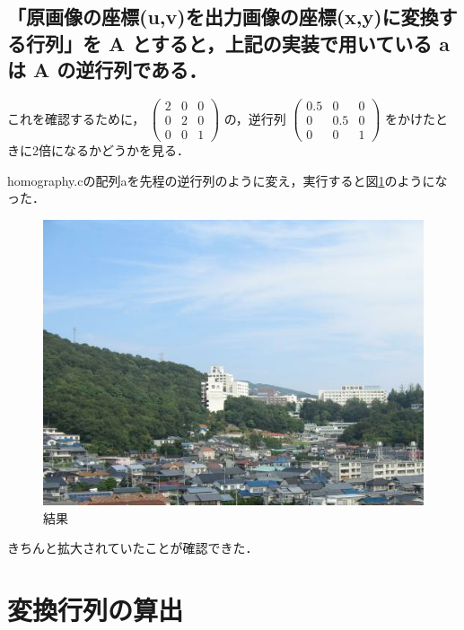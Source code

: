\documentclass[11pt]{jarticle}
\begin{document}
\subsection{「原画像の座標(u,v)を出力画像の座標(x,y)に変換する行列」を A とすると，上記の実装で用いている a は A の逆行列である．}
これを確認するために，
    $ \left(
        \begin{array}{rrr}
        2 & 0 & 0 \\
        0 & 2 & 0 \\
        0 & 0 & 1
        \end{array}
    \right) $
の，逆行列
$ \left(
    \begin{array}{rrr}
    0.5 & 0 & 0 \\
    0 & 0.5 & 0 \\
    0 & 0 & 1
    \end{array}
\right) $
をかけたときに2倍になるかどうかを見る．

homography.cの配列aを先程の逆行列のように変え，実行すると図\ref{2-8.jpg}のようになった．
\begin{figure}[h]
    \centering
    \includegraphics[scale=.2]{2-8.jpg}
    \caption{結果}
    \label{2-8.jpg}
\end{figure}

きちんと拡大されていたことが確認できた．

\section{変換行列の算出}
\end{document}
